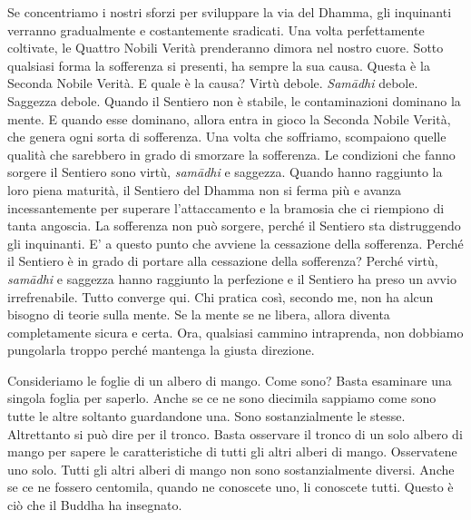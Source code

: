 Se concentriamo i nostri sforzi per sviluppare la via del Dhamma, gli
inquinanti verranno gradualmente e costantemente sradicati. Una volta
perfettamente coltivate, le Quattro Nobili Verità prenderanno dimora nel
nostro cuore. Sotto qualsiasi forma la sofferenza si presenti, ha sempre
la sua causa. Questa è la Seconda Nobile Verità. E quale è la causa?
Virtù debole. \emph{Samādhi} debole. Saggezza debole. Quando il Sentiero non è
stabile, le contaminazioni dominano la mente. E quando esse dominano,
allora entra in gioco la Seconda Nobile Verità, che genera ogni sorta di
sofferenza. Una volta che soffriamo, scompaiono quelle qualità che
sarebbero in grado di smorzare la sofferenza. Le condizioni che fanno
sorgere il Sentiero sono virtù, \emph{samādhi} e saggezza. Quando hanno
raggiunto la loro piena maturità, il Sentiero del Dhamma non si ferma
più e avanza incessantemente per superare l'attaccamento e la bramosia
che ci riempiono di tanta angoscia. La sofferenza non può sorgere,
perché il Sentiero sta distruggendo gli inquinanti. E' a questo punto
che avviene la cessazione della sofferenza. Perché il Sentiero è in
grado di portare alla cessazione della sofferenza? Perché virtù, \emph{samādhi}
e saggezza hanno raggiunto la perfezione e il Sentiero ha preso un avvio
irrefrenabile. Tutto converge qui. Chi pratica così, secondo me, non ha
alcun bisogno di teorie sulla mente. Se la mente se ne libera, allora
diventa completamente sicura e certa. Ora, qualsiasi cammino
intraprenda, non dobbiamo pungolarla troppo perché mantenga la giusta
direzione.

Consideriamo le foglie di un albero di mango. Come sono? Basta esaminare
una singola foglia per saperlo. Anche se ce ne sono diecimila sappiamo
come sono tutte le altre soltanto guardandone una. Sono sostanzialmente
le stesse. Altrettanto si può dire per il tronco. Basta osservare il
tronco di un solo albero di mango per sapere le caratteristiche di tutti
gli altri alberi di mango. Osservatene uno solo. Tutti gli altri alberi
di mango non sono sostanzialmente diversi. Anche se ce ne fossero
centomila, quando ne conoscete uno, li conoscete tutti. Questo è ciò che
il Buddha ha insegnato.

